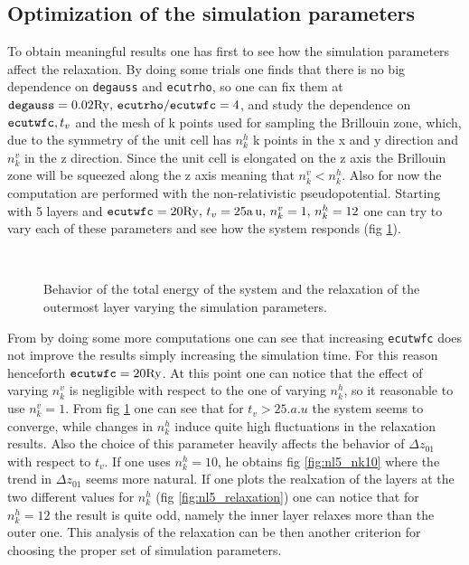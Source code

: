 \documentclass[a4paper, 11pt]{article}
\begin{document}
  \subsection{Optimization of the simulation parameters}
    To obtain meaningful results one has first to see how the simulation parameters affect the relaxation. By doing some trials one finds that there is no big dependence on \verb|degauss| and \verb|ecutrho|, so one can fix them at $\verb|degauss| = 0.02 \si{.Ry},\, \verb|ecutrho|/\verb|ecutwfc| = 4$, and study the dependence on $\verb|ecutwfc|, t_v$ and the mesh of k points used for sampling the Brillouin zone, which, due to the symmetry of the unit cell has $n_k^h$ k points in the x and y direction and $n_k^v$ in the z direction. Since the unit cell is elongated on the z axis the Brillouin zone will be squeezed along the z axis meaning that $n_k^v < n_k^h$. Also for now the computation are performed with the non-relativistic pseudopotential.
    Starting with 5 layers and $\verb|ecutwfc| = 20 \si{.Ry},\, t_v = 25 \si{.a.u},\, n_k^v = 1,\, n_k^h = 12$ one can try to vary each of these parameters and see how the system responds (fig \ref{fig:nl5_tuning}).

    \begin{figure}[H]
      \centering
       \\
      \caption{Behavior of the total energy of the system and the relaxation of the outermost layer varying the simulation parameters.}
      \label{fig:nl5_tuning}
    \end{figure}

    From by doing some more computations one can see that increasing \verb|ecutwfc| does not improve the results simply increasing the simulation time. For this reason henceforth $\verb|ecutwfc| = 20 \si{.Ry}$. At this point one can notice that the effect of varying $n_k^v$ is negligible with respect to the one of varying $n_k^h$, so it reasonable to use $n_k^v = 1$.
    From fig \ref{fig:nl5_tuning} one can see that for $t_v > 25 \si{.a.u}$ the system seems to converge, while changes in $n_k^h$ induce quite high fluctuations in the relaxation results. Also the choice of this parameter heavily affects the behavior of $\Delta z_{01}$ with respect to $t_v$. If one uses $n_k^h = 10$, he obtains fig \ref{fig:nl5_nk10} where the trend in $\Delta z_{01}$ seems more natural.
    If one plots the realxation of the layers at the two different values for $n_k^h$ (fig \ref{fig:nl5_relaxation}) one can notice that for $n_k^h = 12$ the result is quite odd, namely the inner layer relaxes more than the outer one. This analysis of the relaxation can be then another criterion for choosing the proper set of simulation parameters.
\end{document}
